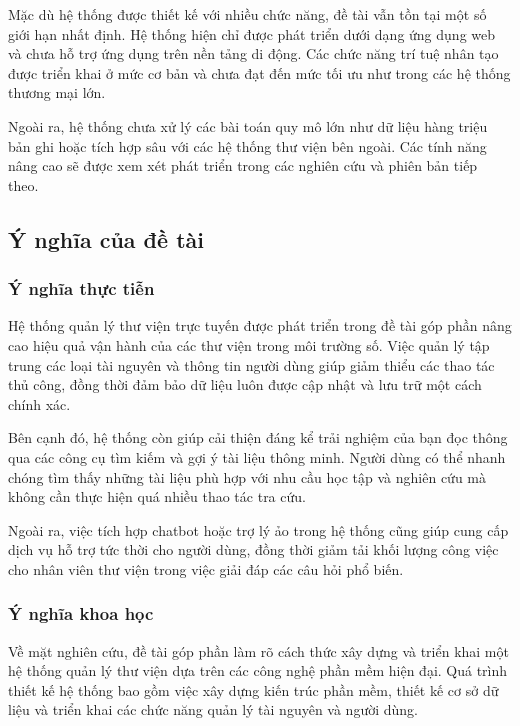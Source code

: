 Mặc dù hệ thống được thiết kế với nhiều chức năng, đề tài vẫn tồn tại một số giới hạn nhất định. Hệ thống hiện chỉ được phát triển dưới dạng ứng dụng web và chưa hỗ trợ ứng dụng trên nền tảng di động. Các chức năng trí tuệ nhân tạo được triển khai ở mức cơ bản và chưa đạt đến mức tối ưu như trong các hệ thống thương mại lớn.

Ngoài ra, hệ thống chưa xử lý các bài toán quy mô lớn như dữ liệu hàng triệu bản ghi hoặc tích hợp sâu với các hệ thống thư viện bên ngoài. Các tính năng nâng cao sẽ được xem xét phát triển trong các nghiên cứu và phiên bản tiếp theo.

\subsection{Ý nghĩa của đề tài}

\subsubsection{Ý nghĩa thực tiễn}

Hệ thống quản lý thư viện trực tuyến được phát triển trong đề tài góp phần nâng cao hiệu quả vận hành của các thư viện trong môi trường số. Việc quản lý tập trung các loại tài nguyên và thông tin người dùng giúp giảm thiểu các thao tác thủ công, đồng thời đảm bảo dữ liệu luôn được cập nhật và lưu trữ một cách chính xác.

Bên cạnh đó, hệ thống còn giúp cải thiện đáng kể trải nghiệm của bạn đọc thông qua các công cụ tìm kiếm và gợi ý tài liệu thông minh. Người dùng có thể nhanh chóng tìm thấy những tài liệu phù hợp với nhu cầu học tập và nghiên cứu mà không cần thực hiện quá nhiều thao tác tra cứu.

Ngoài ra, việc tích hợp chatbot hoặc trợ lý ảo trong hệ thống cũng giúp cung cấp dịch vụ hỗ trợ tức thời cho người dùng, đồng thời giảm tải khối lượng công việc cho nhân viên thư viện trong việc giải đáp các câu hỏi phổ biến.

\subsubsection{Ý nghĩa khoa học}

Về mặt nghiên cứu, đề tài góp phần làm rõ cách thức xây dựng và triển khai một hệ thống quản lý thư viện dựa trên các công nghệ phần mềm hiện đại. Quá trình thiết kế hệ thống bao gồm việc xây dựng kiến trúc phần mềm, thiết kế cơ sở dữ liệu và triển khai các chức năng quản lý tài nguyên và người dùng.

